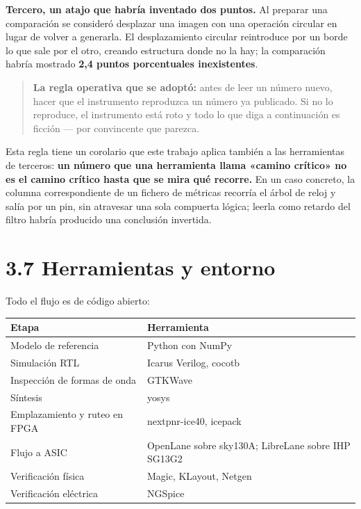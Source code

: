 \textbf{Tercero, un atajo que habría inventado dos puntos.} Al preparar
una comparación se consideró desplazar una imagen con una operación
circular en lugar de volver a generarla. El desplazamiento circular
reintroduce por un borde lo que sale por el otro, creando estructura
donde no la hay; la comparación habría mostrado \textbf{2,4 puntos
porcentuales inexistentes}.

\begin{quote}
\textbf{La regla operativa que se adoptó:} antes de leer un número
nuevo, hacer que el instrumento reproduzca un número ya publicado. Si no
lo reproduce, el instrumento está roto y todo lo que diga a continuación
es ficción --- por convincente que parezca.
\end{quote}

Esta regla tiene un corolario que este trabajo aplica también a las
herramientas de terceros: \textbf{un número que una herramienta llama
«camino crítico» no es el camino crítico hasta que se mira qué recorre.}
En un caso concreto, la columna correspondiente de un fichero de
métricas recorría el árbol de reloj y salía por un pin, sin atravesar
una sola compuerta lógica; leerla como retardo del filtro habría
producido una conclusión invertida.

\section{3.7 Herramientas y entorno}\label{herramientas-y-entorno}

Todo el flujo es de código abierto:

\begin{longtable}[]{@{}ll@{}}
\toprule\noalign{}
Etapa & Herramienta \\
\midrule\noalign{}
\endhead
\bottomrule\noalign{}
\endlastfoot
Modelo de referencia & Python con NumPy \\
Simulación RTL & Icarus Verilog, cocotb \\
Inspección de formas de onda & GTKWave \\
Síntesis & yosys \\
Emplazamiento y ruteo en FPGA & nextpnr-ice40, icepack \\
Flujo a ASIC & OpenLane sobre sky130A; LibreLane sobre IHP SG13G2 \\
Verificación física & Magic, KLayout, Netgen \\
Verificación eléctrica & NGSpice \\
\end{longtable}

